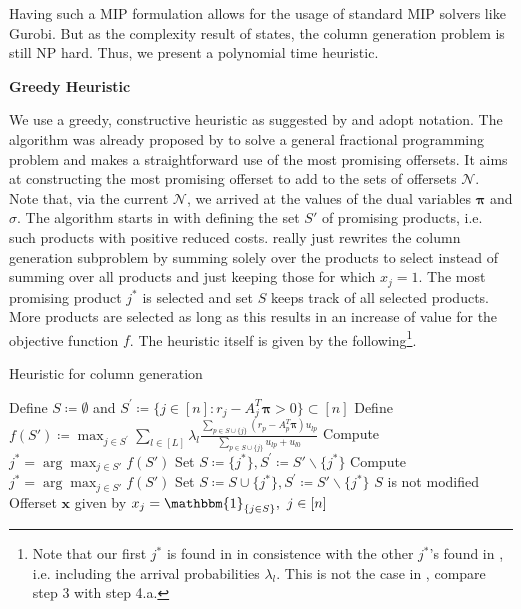 Having such a MIP formulation allows for the usage of standard MIP solvers like Gurobi. But as the complexity result of \cite{Bront.2009} states, the column generation problem is still NP hard. Thus, we present a polynomial time heuristic.

\textbf{Greedy Heuristic} 

We use a greedy, constructive heuristic as suggested by \cite{Bront.2009} and adopt notation. The algorithm was already proposed by \cite{Prokopyev.2005b} to solve a general fractional programming problem and makes a straightforward use of the most promising offersets. It aims at constructing the most promising offerset to add to the sets of offersets $\mathcal{N}$. Note that, via the current $\mathcal{N}$, we arrived at the values of the dual variables $\boldsymbol{\pi}$ and $\sigma$. The algorithm starts in  with defining the set $S'$ of promising products, i.e. such products with positive reduced costs.  really just rewrites the column generation subproblem  by summing solely over the products to select instead of summing over all products and just keeping those for which $x_j=1$. The most promising product $j^*$ is selected and set $S$ keeps track of all selected products. More products are selected as long as this results in an increase of value for the objective function $f$. The heuristic itself is given by the following\footnote{Note that our first $j^*$ is found in  in consistence with the other $j^*$'s found in , i.e. including the arrival probabilities $\lambda_l$. This is not the case in \cite{Bront.2009}, compare step 3 with step 4.a.}.

\begin{algorithm}
	\caption{Heuristic for column generation}\label{alg-ColGen}
	\begin{algorithmic}[1]
		\State Define $S \coloneqq \emptyset$ and $S^{'} \coloneqq \{j \in [n]: r_j - A_j^T\boldsymbol{\pi} > 0\} \subset [n]$ \label{alg-CG-1}
		\State Define $f(S') \coloneqq \max_{j \in S^{'}} \sum_{l \in [L]} \lambda_l  \frac{\sum_{p \in S \cup \{j\}} (r_p - A_p^T\boldsymbol{\pi}) u_{lp}}{\sum_{p \in S \cup \{j\}}u_{lp} + u_{l0}}\label{alg-CG-2}$
		\State Compute $ j^* = \arg \max_{j \in S'} f(S') \label{alg-CG-3}$
		\State Set $S \coloneqq \{j^*\}, S^{'} \coloneqq S' \backslash \{ j^*\}$
		\Repeat
			\State Compute $ j^* = \arg \max_{j \in S'} f(S') \label{alg-CG-6}$
			\State Set $S \coloneqq S \cup \{j^*\}, S^{'} \coloneqq S' \backslash \{ j^*\}$
			\EndIf
		\Until $S$ is not modified
		\State \Return Offerset $\boldsymbol{x}$ given by $x_j = \mathbbm{1}_{\{j \in S\}}, ~j\in[n]$
	\end{algorithmic}
\end{algorithm}

